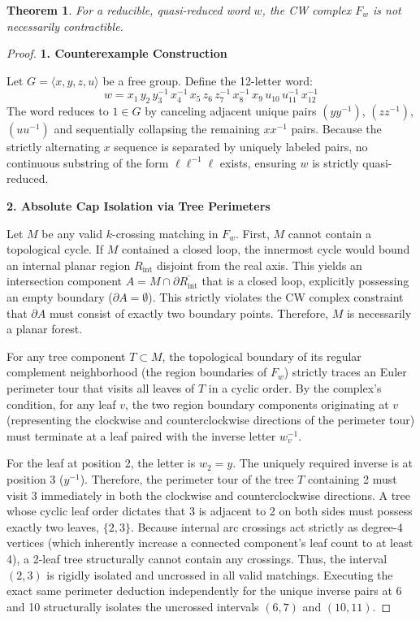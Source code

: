\documentclass[12pt]{article}
\newtheorem{theorem}{Theorem}
\begin{document}
\begin{theorem}
For a reducible, quasi-reduced word $w$, the CW complex $F_w$ is not necessarily contractible.
\end{theorem}

\begin{proof}
\textbf{1. Counterexample Construction}

Let $G = \langle x, y, z, u \rangle$ be a free group. Define the 12-letter word:
\[
w = x_1\, y_2\, y_3^{-1}\, x_4^{-1}\, x_5\, z_6\, z_7^{-1}\, x_8^{-1}\, x_9\, u_{10}\, u_{11}^{-1}\, x_{12}^{-1}
\]
The word reduces to $1 \in G$ by canceling adjacent unique pairs $(y y^{-1})$, $(z z^{-1})$, $(u u^{-1})$ and sequentially collapsing the remaining $x x^{-1}$ pairs. Because the strictly alternating $x$ sequence is separated by uniquely labeled pairs, no continuous substring of the form $\ell \ell^{-1} \ell$ exists, ensuring $w$ is strictly quasi-reduced.

\vspace{1em}
\noindent\textbf{2. Absolute Cap Isolation via Tree Perimeters}

Let $M$ be any valid $k$-crossing matching in $F_w$. First, $M$ cannot contain a topological cycle. If $M$ contained a closed loop, the innermost cycle would bound an internal planar region $R_{\text{int}}$ disjoint from the real axis. This yields an intersection component $A = M \cap \partial \overline{R_{\text{int}}}$ that is a closed loop, explicitly possessing an empty boundary ($\partial A = \emptyset$). This strictly violates the CW complex constraint that $\partial A$ must consist of exactly two boundary points. Therefore, $M$ is necessarily a planar forest.

For any tree component $T \subset M$, the topological boundary of its regular complement neighborhood (the region boundaries of $F_w$) strictly traces an Euler perimeter tour that visits all leaves of $T$ in a cyclic order. By the complex's condition, for any leaf $v$, the two region boundary components originating at $v$ (representing the clockwise and counterclockwise directions of the perimeter tour) must terminate at a leaf paired with the inverse letter $w_v^{-1}$.

For the leaf at position 2, the letter is $w_2 = y$. The uniquely required inverse is at position 3 ($y^{-1}$). Therefore, the perimeter tour of the tree $T$ containing 2 must visit 3 immediately in both the clockwise and counterclockwise directions. A tree whose cyclic leaf order dictates that 3 is adjacent to 2 on both sides must possess exactly two leaves, $\{2,3\}$. Because internal arc crossings act strictly as degree-4 vertices (which inherently increase a connected component's leaf count to at least 4), a 2-leaf tree structurally cannot contain any crossings. Thus, the interval $(2,3)$ is rigidly isolated and uncrossed in all valid matchings. Executing the exact same perimeter deduction independently for the unique inverse pairs at 6 and 10 structurally isolates the uncrossed intervals $(6,7)$ and $(10,11)$.


\end{proof}
\end{document}
